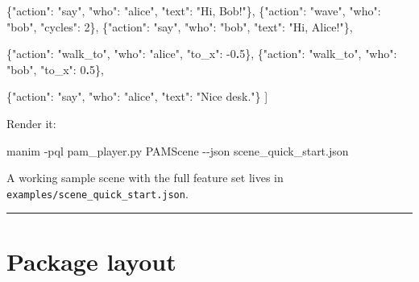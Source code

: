 \documentclass[
  11pt,
]{book}
\newenvironment{Shaded}{}{}
\newcommand{\AttributeTok}[1]{\textcolor[rgb]{0.49,0.56,0.16}{#1}}
\newcommand{\DataTypeTok}[1]{\textcolor[rgb]{0.56,0.13,0.00}{#1}}
\newcommand{\DecValTok}[1]{\textcolor[rgb]{0.25,0.63,0.44}{#1}}
\newcommand{\ErrorTok}[1]{\textcolor[rgb]{1.00,0.00,0.00}{\textbf{#1}}}
\newcommand{\ExtensionTok}[1]{#1}
\newcommand{\FunctionTok}[1]{\textcolor[rgb]{0.02,0.16,0.49}{#1}}
\newcommand{\NormalTok}[1]{#1}
\newcommand{\OtherTok}[1]{\textcolor[rgb]{0.00,0.44,0.13}{#1}}
\newcommand{\StringTok}[1]{\textcolor[rgb]{0.25,0.44,0.63}{#1}}
\begin{document}
\begin{Shaded}
\begin{Highlighting}[]
  \FunctionTok{\{}\DataTypeTok{"action"}\FunctionTok{:} \StringTok{"say"}\FunctionTok{,}  \DataTypeTok{"who"}\FunctionTok{:} \StringTok{"alice"}\FunctionTok{,} \DataTypeTok{"text"}\FunctionTok{:} \StringTok{"Hi, Bob!"}\FunctionTok{\}}\OtherTok{,}
  \FunctionTok{\{}\DataTypeTok{"action"}\FunctionTok{:} \StringTok{"wave"}\FunctionTok{,} \DataTypeTok{"who"}\FunctionTok{:} \StringTok{"bob"}\FunctionTok{,} \DataTypeTok{"cycles"}\FunctionTok{:} \DecValTok{2}\FunctionTok{\}}\OtherTok{,}
  \FunctionTok{\{}\DataTypeTok{"action"}\FunctionTok{:} \StringTok{"say"}\FunctionTok{,}  \DataTypeTok{"who"}\FunctionTok{:} \StringTok{"bob"}\FunctionTok{,}   \DataTypeTok{"text"}\FunctionTok{:} \StringTok{"Hi, Alice!"}\FunctionTok{\}}\OtherTok{,}

  \FunctionTok{\{}\DataTypeTok{"action"}\FunctionTok{:} \StringTok{"walk\_to"}\FunctionTok{,} \DataTypeTok{"who"}\FunctionTok{:} \StringTok{"alice"}\FunctionTok{,} \DataTypeTok{"to\_x"}\FunctionTok{:} \DecValTok{{-}0}\ErrorTok{.}\DecValTok{5}\FunctionTok{\}}\OtherTok{,}
  \FunctionTok{\{}\DataTypeTok{"action"}\FunctionTok{:} \StringTok{"walk\_to"}\FunctionTok{,} \DataTypeTok{"who"}\FunctionTok{:} \StringTok{"bob"}\FunctionTok{,}   \DataTypeTok{"to\_x"}\FunctionTok{:}  \DecValTok{0}\ErrorTok{.}\DecValTok{5}\FunctionTok{\}}\OtherTok{,}

  \FunctionTok{\{}\DataTypeTok{"action"}\FunctionTok{:} \StringTok{"say"}\FunctionTok{,} \DataTypeTok{"who"}\FunctionTok{:} \StringTok{"alice"}\FunctionTok{,} \DataTypeTok{"text"}\FunctionTok{:} \StringTok{"Nice desk."}\FunctionTok{\}}
\OtherTok{]}
\end{Highlighting}
\end{Shaded}

Render it:

\begin{Shaded}
\begin{Highlighting}[]
\ExtensionTok{manim} \AttributeTok{{-}pql}\NormalTok{ pam\_player.py PAMScene }\AttributeTok{{-}{-}json}\NormalTok{ scene\_quick\_start.json}
\end{Highlighting}
\end{Shaded}

A working sample scene with the full feature set lives in
\texttt{examples/scene\_quick\_start.json}.

\begin{center}\rule{0.5\linewidth}{0.5pt}\end{center}

\section{Package layout}\label{package-layout}
\end{document}
